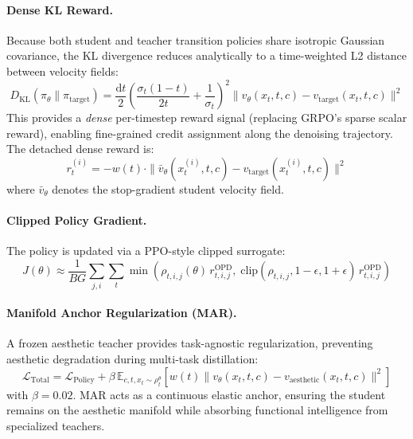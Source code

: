 \documentclass[11pt]{article}
\begin{document}
\paragraph{Dense KL Reward.}
Because both student and teacher transition policies share isotropic Gaussian covariance, the KL divergence reduces analytically to a time-weighted L2 distance between velocity fields:
\begin{equation}
    D_{\mathrm{KL}}(\pi_\theta \| \pi_{\mathrm{target}}) = \frac{\mathrm{d}t}{2}\!\left(\frac{\sigma_t(1-t)}{2t} + \frac{1}{\sigma_t}\right)^{\!2} \|v_\theta(x_t, t, c) - v_{\mathrm{target}}(x_t, t, c)\|^2
\end{equation}
This provides a \emph{dense} per-timestep reward signal (replacing GRPO's sparse scalar reward), enabling fine-grained credit assignment along the denoising trajectory. The detached dense reward is:
\begin{equation}
    r_t^{(i)} = -w(t) \cdot \|\bar{v}_\theta(x_t^{(i)}, t, c) - v_{\mathrm{target}}(x_t^{(i)}, t, c)\|^2
\end{equation}
where $\bar{v}_\theta$ denotes the stop-gradient student velocity field.

\paragraph{Clipped Policy Gradient.}
The policy is updated via a PPO-style clipped surrogate:
\begin{equation}
    J(\theta) \approx \frac{1}{BG} \sum_{j,i} \sum_t \min\!\left(\rho_{t,i,j}(\theta)\, r_{t,i,j}^{\mathrm{OPD}},\; \mathrm{clip}(\rho_{t,i,j}, 1{-}\epsilon, 1{+}\epsilon)\, r_{t,i,j}^{\mathrm{OPD}}\right)
\end{equation}

\paragraph{Manifold Anchor Regularization (MAR).}
A frozen aesthetic teacher provides task-agnostic regularization, preventing aesthetic degradation during multi-task distillation:
\begin{equation}
    \mathcal{L}_{\mathrm{Total}} = \mathcal{L}_{\mathrm{Policy}} + \beta\, \mathbb{E}_{c,t,x_t \sim \rho_t^\theta}\!\left[w(t) \|v_\theta(x_t,t,c) - v_{\mathrm{aesthetic}}(x_t,t,c)\|^2\right]
\end{equation}
with $\beta = 0.02$. MAR acts as a continuous elastic anchor, ensuring the student remains on the aesthetic manifold while absorbing functional intelligence from specialized teachers.
\end{document}
